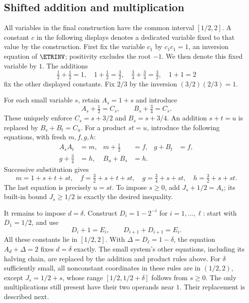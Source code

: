 \subsection{Shifted addition and multiplication}

All variables in the final construction have the common interval
$[1/2,2]$. A constant $c$ in the following displays denotes a dedicated
variable fixed to that value by the construction. First fix the variable $c_1$ by
$c_1c_1=1$, an inversion equation of $\ETRINV$; positivity excludes
the root $-1$. We then denote this fixed variable by $1$. The additions
\[
 \tfrac12+\tfrac12=1,\quad
 1+\tfrac12=\tfrac32,\quad
 \tfrac34+\tfrac34=\tfrac32,\quad 1+1=2
\]
fix the other displayed constants. Fix $2/3$ by the inversion
$(3/2)(2/3)=1$.

For each small variable $s$, retain $A_s=1+s$ and introduce
\begin{equation}
\label{eq:shift-coordinates}
 A_s+\tfrac12=C_s,\qquad B_s+\tfrac34=C_s.
\end{equation}
These uniquely enforce $C_s=s+3/2$ and $B_s=s+3/4$.
An addition $s+t=u$ is replaced by $B_s+B_t=C_u$.
For a product $st=u$, introduce the following equations, with fresh
$m,f,g,h$:
\begin{equation}
\label{eq:shift-product}
 \begin{aligned}
 A_sA_t&=m,& m+\tfrac12&=f,& g+B_t&=f,\\
 g+\tfrac34&=h,& B_u+B_s&=h.
 \end{aligned}
\end{equation}
Successive substitution gives
\[
 m=1+s+t+st,\quad f=\tfrac32+s+t+st,\quad
 g=\tfrac34+s+st,\quad h=\tfrac32+s+st.
\]
The last equation is precisely $u=st$.
To impose $s\ge0$, add $J_s+1/2=A_s$; its built-in bound
$J_s\ge1/2$ is exactly the desired inequality.

It remains to impose $d=\delta$. Construct $D_i=1-2^{-i}$ for
$i=1,\ldots,\ell$: start with $D_1=1/2$, and use
\[
 D_i+1=E_i,\qquad D_{i+1}+D_{i+1}=E_i.
\]
All these constants lie in $[1/2,2]$. With $\Delta=D_\ell=1-\delta$,
the equation $A_d+\Delta=2$ fixes $d=\delta$ exactly. The small
system's other equations, including its halving chain, are replaced by
the addition and product rules above. For $\delta$ sufficiently small,
all nonconstant coordinates in these rules are in $(1/2,2)$, except
$J_s=1/2+s$, whose range $[1/2,1/2+\delta]$ follows from $s\ge0$.
The only multiplications still present have their two operands near $1$.
Their replacement is described next.

